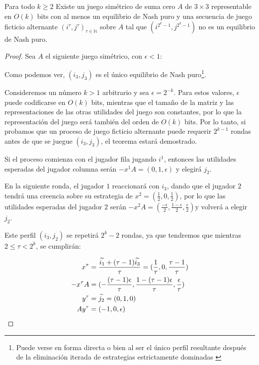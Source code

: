 \begin{theorem} \label{teorema:afp:velocidad:simetricos}
    Para todo $k \geq 2$ Existe un juego simétrico de suma cero $A$ de $3 \times 3$ representable en $O(k)$ bits con al menos un equilibrio de Nash puro y una secuencia de juego ficticio alternante $(i^\tau, j^\tau)_{\tau \in \mathbb{N}}$ sobre $A$ tal que $(i^{2^k-1}, j^{2^k-1})$ no es un equilibrio de Nash puro.
\end{theorem}
\begin{proof}
    Sea $A$ el siguiente juego simétrico, con $\epsilon < 1$:

    

    Como podemos ver, $(i_3, j_3)$ es el único equilibrio de Nash puro\footnote{Puede verse en forma directa o bien al ser el único perfil resultante después de la eliminación iterada de estrategias estrictamente dominadas \cite{libro:rubinstein}}.

    Consideremos un número $k > 1$ arbitrario y sea $\epsilon = 2^{-k}$. Para estos valores, $\epsilon$ puede codificarse en $O(k)$ bits, mientras que el tamaño de la matriz y las representaciones de las otras utilidades del juego son constantes, por lo que la representación del juego será también del orden de  $O(k)$ bits. Por lo tanto, si probamos que un proceso de juego ficticio alternante puede requerir $2^{k-1}$ rondas antes de que se juegue $(i_3, j_3)$, el teorema estará demostrado.

    Si el proceso comienza con el jugador fila jugando $i^1$, entonces las utilidades esperadas del jugador columna serán $-x^1A = (0, 1, \epsilon)$ y elegirá $j_2$.

    En la siguiente ronda, el jugador $1$ reaccionará con $i_3$, dando que el jugador $2$ tendrá una creencia sobre su estrategia de $x^2 = (\frac{1}{2},0,\frac{1}{2})$, por lo que las utilidades esperadas del jugador $2$ serán $-x^2A = (\frac{-\epsilon}{2}, \frac{1-\epsilon}{2}, \frac{\epsilon}{2})$y volverá a elegir $j_2$.

    Este perfil $(i_3, j_2)$ se repetirá $2^k - 2$ rondas, ya que tendremos que mientras $2 \le \tau < 2^k$, se cumplirán:

    \begin{align*}
        x^\tau     &= \frac{\widetilde{i_1} + (\tau - 1) \widetilde{i_3}}{\tau} = (\frac{1}{\tau}, 0,\frac{\tau - 1}{\tau}) \\
        -x^{\tau}A &= (-\frac{(\tau-1) \epsilon}{\tau}, \frac{1-(\tau-1)\epsilon}{\tau}, \frac{\epsilon}{\tau}) \\
        y^\tau     &= \widetilde{j_2} = (0, 1, 0) \\
        Ay^\tau    &= (- 1, 0, \epsilon) \\
    \end{align*}


\end{proof}
